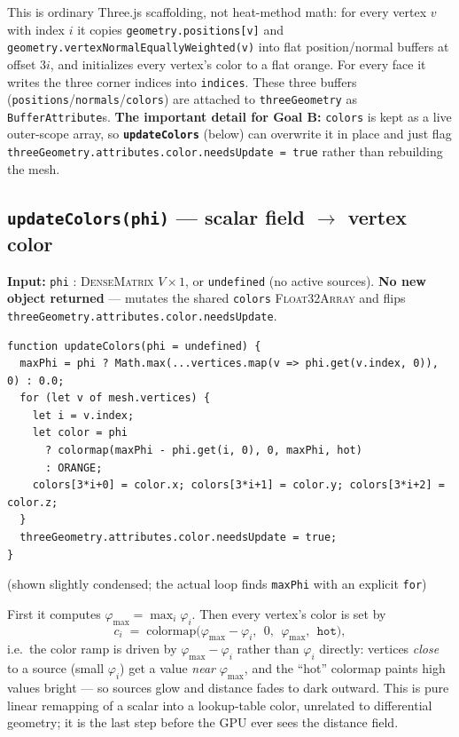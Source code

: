 \documentclass[11pt]{article}
\newcommand{\code}[1]{\texttt{#1}}
\newcommand{\func}[1]{\texttt{\textbf{#1}}}
\newcommand{\type}[1]{\textsc{#1}}
\begin{document}
This is ordinary Three.js scaffolding, not heat-method math: for every vertex $v$ with
index $i$ it copies \code{geometry.positions[v]} and
\code{geometry.vertexNormalEquallyWeighted(v)} into flat position/normal buffers at offset
$3i$, and initializes every vertex's color to a flat orange. For every face it writes the
three corner indices into \code{indices}. These three buffers
(\code{positions}/\code{normals}/\code{colors}) are attached to \code{threeGeometry} as
\code{BufferAttribute}s. \textbf{The important detail for Goal B:} \code{colors} is kept as
a live outer-scope array, so \func{updateColors} (below) can overwrite it in place and just
flag \code{threeGeometry.attributes.color.needsUpdate = true} rather than rebuilding the
mesh.

\subsection{\func{updateColors(phi)} --- scalar field $\to$ vertex color}
\textbf{Input:} \code{phi} : \type{DenseMatrix} $V\times1$, or \code{undefined} (no active
sources). \textbf{No new object returned} --- mutates the shared \code{colors}
\type{Float32Array} and flips \code{threeGeometry.attributes.color.needsUpdate}.

\begin{lstlisting}
function updateColors(phi = undefined) {
  maxPhi = phi ? Math.max(...vertices.map(v => phi.get(v.index, 0)), 0) : 0.0;
  for (let v of mesh.vertices) {
    let i = v.index;
    let color = phi
      ? colormap(maxPhi - phi.get(i, 0), 0, maxPhi, hot)
      : ORANGE;
    colors[3*i+0] = color.x; colors[3*i+1] = color.y; colors[3*i+2] = color.z;
  }
  threeGeometry.attributes.color.needsUpdate = true;
}
\end{lstlisting}
(shown slightly condensed; the actual loop finds \code{maxPhi} with an explicit \code{for})

First it computes $\varphi_{\max} = \max_i \varphi_i$. Then every vertex's color is set by
\[
  c_i \;=\; \mathrm{colormap}\!\big(\varphi_{\max}-\varphi_i,\ \ 0,\ \ \varphi_{\max},\ \ \texttt{hot}\big),
\]
i.e.\ the color ramp is driven by $\varphi_{\max}-\varphi_i$ rather than $\varphi_i$
directly: vertices \emph{close} to a source (small $\varphi_i$) get a value \emph{near}
$\varphi_{\max}$, and the ``hot'' colormap paints high values bright --- so sources glow
and distance fades to dark outward. This is pure linear remapping of a scalar into a
lookup-table color, unrelated to differential geometry; it is the last step before the GPU
ever sees the distance field.
\end{document}
